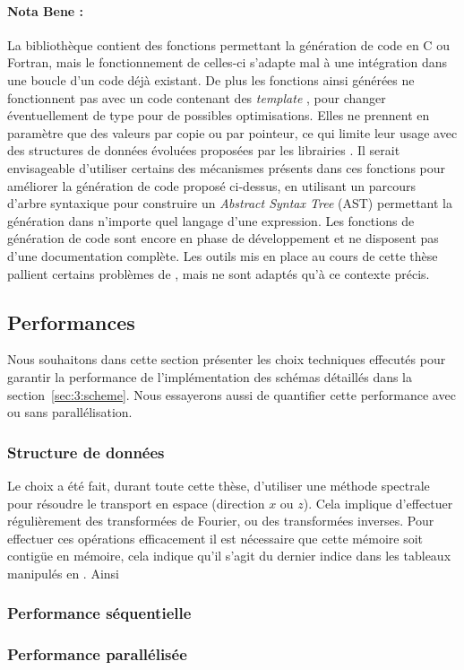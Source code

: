 \paragraph{Nota Bene :} La bibliothèque \sympy{} contient des fonctions permettant la génération de code en C ou Fortran, mais le fonctionnement de celles-ci s'adapte mal à une intégration dans une boucle d'un code déjà existant. De plus les fonctions ainsi générées ne fonctionnent pas avec un code contenant des \emph{template} \CC, pour changer éventuellement de type pour de possibles optimisations. Elles ne prennent en paramètre que des valeurs par copie ou par pointeur, ce qui limite leur usage avec des structures de données évoluées proposées par les librairies \CC. Il serait envisageable d'utiliser certains des mécanismes présents dans ces fonctions pour améliorer la génération de code proposé ci-dessus, en utilisant un parcours d'arbre syntaxique pour construire un \emph{Abstract Syntax Tree} (AST) permettant la génération dans n'importe quel langage d'une expression. Les fonctions \sympy{} de génération de code sont encore en phase de développement et ne disposent pas d'une documentation complète. Les outils mis en place au cours de cette thèse pallient certains problèmes de \sympy{}, mais ne sont adaptés qu'à ce contexte précis.

\subsection{Performances}

Nous souhaitons dans cette section présenter les choix techniques effecutés pour garantir la performance de l'implémentation des schémas détaillés dans la section~\ref{sec:3:scheme}. Nous essayerons aussi de quantifier cette performance avec ou sans parallélisation.

\subsubsection{Structure de données}

Le choix a été fait, durant toute cette thèse, d'utiliser une méthode spectrale pour résoudre le transport en espace (direction $x$ ou $z$). Cela implique d'effectuer régulièrement des transformées de Fourier, ou des transformées inverses. Pour effectuer ces opérations efficacement il est nécessaire que cette mémoire soit contigüe en mémoire, cela indique qu'il s'agit du dernier indice dans les tableaux manipulés en \CC. Ainsi 

\subsubsection{Performance séquentielle}

\subsubsection{Performance parallélisée}


